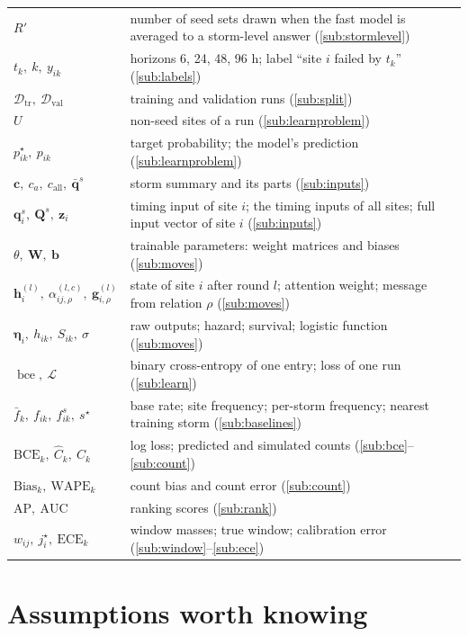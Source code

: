 \documentclass[11pt]{article}
\newcommand{\bce}{\operatorname{bce}}
\begin{document}
\begin{tabular}{@{}p{}p{}@{}}
$R'$ & number of seed sets drawn when the fast model is averaged to a storm-level answer (\ref{sub:stormlevel}) \\
$t_k,\ k,\ y_{ik}$ & horizons 6, 24, 48, 96 h; label ``site $i$ failed by $t_k$'' (\ref{sub:labels}) \\
$\mathcal D_{\mathrm{tr}},\ \mathcal D_{\mathrm{val}}$ & training and validation runs (\ref{sub:split}) \\
$U$ & non-seed sites of a run (\ref{sub:learnproblem}) \\
$p^\star_{ik},\ p_{ik}$ & target probability; the model's prediction (\ref{sub:learnproblem}) \\
$\mathbf c,\ c_a,\ c_{\mathrm{all}},\ \bar{\mathbf q}^s$ & storm summary and its parts (\ref{sub:inputs}) \\
$\mathbf q_i^s,\ \mathbf Q^s,\ \mathbf z_i$ & timing input of site $i$; the timing inputs of all sites; full input vector of site $i$ (\ref{sub:inputs}) \\
$\theta,\ \mathbf W,\ \mathbf b$ & trainable parameters: weight matrices and biases (\ref{sub:moves}) \\
$\mathbf h^{(l)}_i,\ \alpha^{(l,c)}_{ij,\rho},\ \mathbf g^{(l)}_{i,\rho}$ & state of site $i$ after round $l$; attention weight; message from relation $\rho$ (\ref{sub:moves}) \\
$\bm\eta_i,\ h_{ik},\ S_{ik},\ \sigma$ & raw outputs; hazard; survival; logistic function (\ref{sub:moves}) \\
$\bce,\ \mathcal L$ & binary cross-entropy of one entry; loss of one run (\ref{sub:learn}) \\
$\bar f_k,\ f_{ik},\ f^s_{ik},\ s^\star$ & base rate; site frequency; per-storm frequency; nearest training storm (\ref{sub:baselines}) \\
$\mathrm{BCE}_k,\ \hat C_k,\ C_k$ & log loss; predicted and simulated counts (\ref{sub:bce}--\ref{sub:count}) \\
$\mathrm{Bias}_k,\ \mathrm{WAPE}_k$ & count bias and count error (\ref{sub:count}) \\
$\mathrm{AP},\ \mathrm{AUC}$ & ranking scores (\ref{sub:rank}) \\
$w_{ij},\ j^\star_i,\ \mathrm{ECE}_k$ & window masses; true window; calibration error (\ref{sub:window}--\ref{sub:ece}) \\
\bottomrule
\end{tabular}
\normalsize

\section{Assumptions worth knowing}\label{sec:assump}
\end{document}
